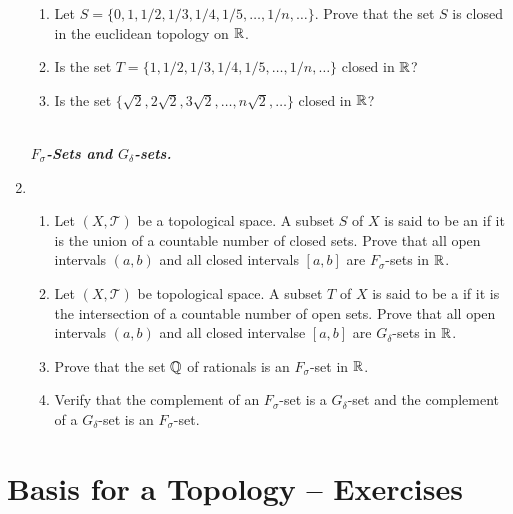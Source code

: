 \documentclass[10pt,a4paper]{report}
\newcommand{\SPECIAL}[1]{\begin{center}
	{\Large \textbf{\textit{\\#1}} }
\end{center}
}
\newcommand{\TT}{\mathcal{T}}
\begin{document}
\begin{enumerate}
\begin{enumerate}[label=(\roman*)]
	\item Let $S=\{0,1,1/2,1/3,1/4,1/5, \dots, 1/n, \dots\}$.  Prove that the set $S$ is closed in the euclidean topology on $\mathbb{R}$.
	
	\item Is the set $T=\{1,1/2,1/3,1/4,1/5,\dots,1/n, \dots\}$ closed in $\mathbb{R}$?
	
	\item Is the set $\{\sqrt{2}, 2\sqrt{2},3\sqrt{2},\dots, n\sqrt{2}, \dots\}$ closed in $\mathbb{R}$?

\end{enumerate}
	
	\SPECIAL{$F_\sigma$-Sets and $G_\delta$-sets.}

\item \begin{enumerate}[label=(\roman*)]

	\item Let $(X, \TT)$ be a topological space.  A subset $S$ of $X$ is said to be an  if it is the union of a countable number of closed sets. Prove that all open intervals $(a,b)$ and all closed intervals $[a,b]$ are $F_\sigma$-sets in $\mathbb{R}$.
	
	\item Let $(X, \TT)$ be topological space.  A subset $T$ of $X$ is said to be a  if it is the intersection of a countable number of open sets.  Prove that all open intervals $(a,b)$ and all closed intervalse $[a,b]$ are $G_\delta$-sets in $\mathbb{R}$.
	
	\item Prove that the set $\mathbb{Q}$ of rationals is an $F_\sigma$-set in $\mathbb{R}$.  
	
	\item Verify that the complement of an $F_\sigma$-set is a $G_\delta$-set and the complement of a $G_\delta$-set is an $F_\sigma$-set.

\end{enumerate}

\end{enumerate}  %

\newpage
\section{Basis for a Topology -- Exercises}
\end{document}

